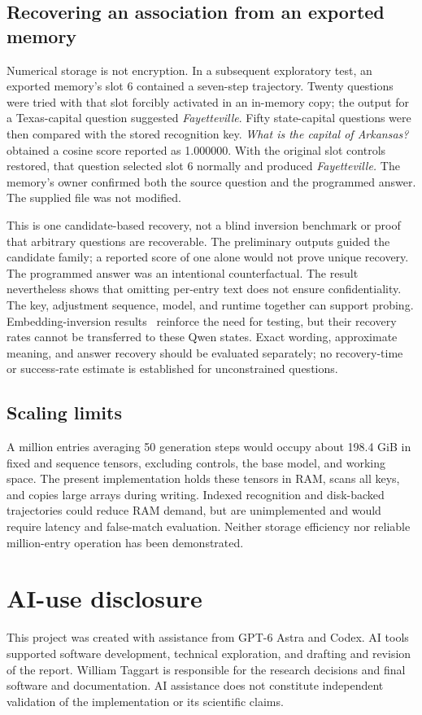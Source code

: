 \documentclass[manuscript,screen,nonacm]{acmart}
\begin{document}
\subsection{Recovering an association from an exported memory}
Numerical storage is not encryption. In a subsequent exploratory test, an exported memory's slot 6 contained a seven-step trajectory. Twenty questions were tried with that slot forcibly activated in an in-memory copy; the output for a Texas-capital question suggested \emph{Fayetteville}. Fifty state-capital questions were then compared with the stored recognition key. \emph{What is the capital of Arkansas?} obtained a cosine score reported as 1.000000. With the original slot controls restored, that question selected slot 6 normally and produced \emph{Fayetteville.} The memory's owner confirmed both the source question and the programmed answer. The supplied file was not modified.

This is one candidate-based recovery, not a blind inversion benchmark or proof that arbitrary questions are recoverable. The preliminary outputs guided the candidate family; a reported score of one alone would not prove unique recovery. The programmed answer was an intentional counterfactual. The result nevertheless shows that omitting per-entry text does not ensure confidentiality. The key, adjustment sequence, model, and runtime together can support probing. Embedding-inversion results~\cite{inversion} reinforce the need for testing, but their recovery rates cannot be transferred to these Qwen states. Exact wording, approximate meaning, and answer recovery should be evaluated separately; no recovery-time or success-rate estimate is established for unconstrained questions.

\subsection{Scaling limits}
A million entries averaging 50 generation steps would occupy about 198.4 GiB in fixed and sequence tensors, excluding controls, the base model, and working space. The present implementation holds these tensors in RAM, scans all keys, and copies large arrays during writing. Indexed recognition and disk-backed trajectories could reduce RAM demand, but are unimplemented and would require latency and false-match evaluation. Neither storage efficiency nor reliable million-entry operation has been demonstrated.

\section*{AI-use disclosure}
This project was created with assistance from GPT-6 Astra and Codex. AI tools supported software development, technical exploration, and drafting and revision of the report. William Taggart is responsible for the research decisions and final software and documentation. AI assistance does not constitute independent validation of the implementation or its scientific claims.
\end{document}
